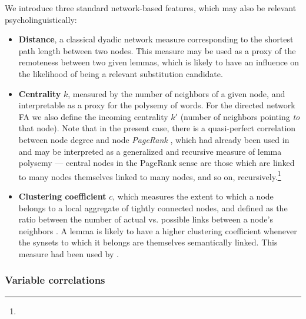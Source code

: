 \bigskip
We introduce three standard network-based features, which may also be relevant psycholinguistically:
\begin{itemize}
    \item \textbf{Distance}, a classical dyadic network measure corresponding to the shortest path length between two nodes. This measure may be used as a proxy of the remoteness between two given lemmas, which is likely to have an influence on the likelihood of being a relevant substitution candidate.
    \item \textbf{Centrality} $k$, measured by the number of neighbors of a given node, and interpretable as a proxy for the polysemy of words. For the directed network FA we also define the incoming centrality $k'$ (number of neighbors pointing \emph{to} that node).  Note that in the present case, there is a quasi-perfect correlation between node degree and node \emph{PageRank} \cite{Page99}, which had already been used in \cite{Griffiths07} and may be interpreted as a generalized and recursive measure of lemma polysemy --- central nodes in the PageRank sense are those which are linked to many nodes themselves linked to many nodes, and so on, recursively.\footnote{}
    \item \textbf{Clustering coefficient} $c$, which measures the extent to which a node belongs to a local aggregate of tightly connected nodes, and defined as the ratio between the number of actual vs. possible links between a node's neighbors \cite{watt-coll}. A lemma is likely to have a higher clustering coefficient whenever the synsets to which it belongs are themselves semantically linked. This measure had been used by \citet{Chan10}.
\end{itemize}

\subsubsection{Variable correlations}

 

